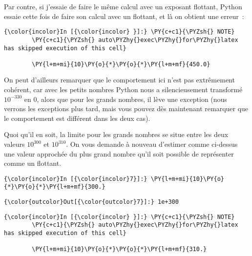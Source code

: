 Par contre, si j'essaie de faire le même calcul avec un exposant
flottant, Python essaie cette fois de faire son calcul avec un flottant,
et là on obtient une erreur~:

    \begin{Verbatim}[commandchars=\\\{\},frame=single,framerule=0.3mm,rulecolor=\color{cellframecolor}]
{\color{incolor}In [{\color{incolor} }]:} \PY{c+c1}{\PYZsh{} NOTE}
        \PY{c+c1}{\PYZsh{} auto\PYZhy{}exec\PYZhy{}for\PYZhy{}latex has skipped execution of this cell}
        
        \PY{l+m+mi}{10}\PY{o}{*}\PY{o}{*}\PY{l+m+mf}{450.0}
\end{Verbatim}


    On peut d'ailleurs remarquer que le comportement ici n'est pas
extrêmement cohérent, car avec les petits nombres Python nous a
silencieusement transformé \(10^{-330}\) en \(0\), alors que pour les
grands nombres, il lève une exception (nous verrons les exceptions plus
tard, mais vous pouvez dès maintenant remarquer que le comportement est
différent dans les deux cas).

    Quoi qu'il en soit, la limite pour les grands nombres se situe entre les
deux valeurs \(10^{300}\) et \(10^{310}\). On vous demande à nouveau
d'estimer comme ci-dessus une valeur approchée du plus grand nombre
qu'il soit possible de représenter comme un flottant.

    \begin{Verbatim}[commandchars=\\\{\},frame=single,framerule=0.3mm,rulecolor=\color{cellframecolor}]
{\color{incolor}In [{\color{incolor}7}]:} \PY{l+m+mi}{10}\PY{o}{*}\PY{o}{*}\PY{l+m+mf}{300.}
\end{Verbatim}


\begin{Verbatim}[commandchars=\\\{\},frame=single,framerule=0.3mm,rulecolor=\color{cellframecolor}]
{\color{outcolor}Out[{\color{outcolor}7}]:} 1e+300
\end{Verbatim}
            
    \begin{Verbatim}[commandchars=\\\{\},frame=single,framerule=0.3mm,rulecolor=\color{cellframecolor}]
{\color{incolor}In [{\color{incolor} }]:} \PY{c+c1}{\PYZsh{} NOTE}
        \PY{c+c1}{\PYZsh{} auto\PYZhy{}exec\PYZhy{}for\PYZhy{}latex has skipped execution of this cell}
        
        \PY{l+m+mi}{10}\PY{o}{*}\PY{o}{*}\PY{l+m+mf}{310.}
\end{Verbatim}


